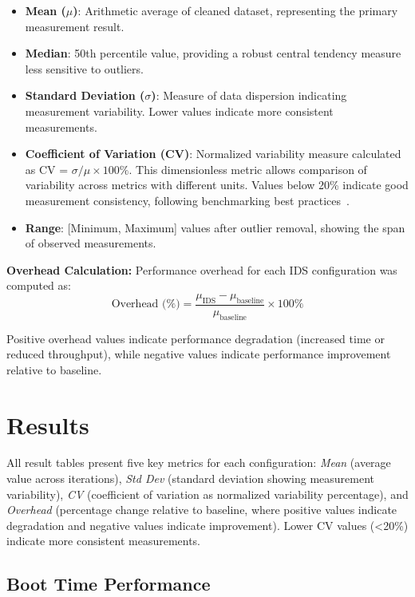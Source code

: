 \documentclass[runningheads,a4paper,english]{llncs}[2022/01/12]
\begin{document}
\begin{itemize}
\item \textbf{Mean ($\mu$)}: Arithmetic average of cleaned dataset, representing the primary measurement result.
\item \textbf{Median}: 50th percentile value, providing a robust central tendency measure less sensitive to outliers.
\item \textbf{Standard Deviation ($\sigma$)}: Measure of data dispersion indicating measurement variability. Lower values indicate more consistent measurements.
\item \textbf{Coefficient of Variation (CV)}: Normalized variability measure calculated as CV = $\sigma/\mu \times 100\%$. This dimensionless metric allows comparison of variability across metrics with different units. Values below 20\% indicate good measurement consistency, following benchmarking best practices~\cite{anandtech-statistical-methods,box2005}.
\item \textbf{Range}: [Minimum, Maximum] values after outlier removal, showing the span of observed measurements.
\end{itemize}

\textbf{Overhead Calculation:} Performance overhead for each IDS configuration was computed as:
\begin{equation}
\text{Overhead (\%)} = \frac{\mu_{\text{IDS}} - \mu_{\text{baseline}}}{\mu_{\text{baseline}}} \times 100\%
\end{equation}

Positive overhead values indicate performance degradation (increased time or reduced throughput), while negative values indicate performance improvement relative to baseline.

\section{Results}
\label{sec:results}

All result tables present five key metrics for each configuration: \textit{Mean} (average value across iterations), \textit{Std Dev} (standard deviation showing measurement variability), \textit{CV} (coefficient of variation as normalized variability percentage), and \textit{Overhead} (percentage change relative to baseline, where positive values indicate degradation and negative values indicate improvement). Lower CV values (<20\%) indicate more consistent measurements.

\subsection{Boot Time Performance}
\end{document}
